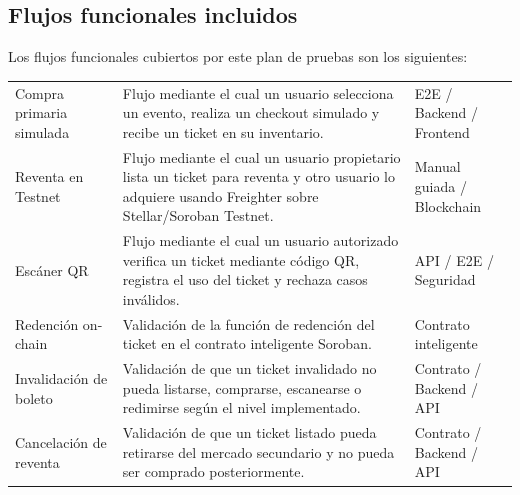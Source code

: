 \documentclass[12pt,letterpaper]{article}
\begin{document}
\subsection{Flujos funcionales incluidos}

Los flujos funcionales cubiertos por este plan de pruebas son los siguientes:

\begin{table}[H]
\centering

\begingroup
\scriptsize
\setlength{\tabcolsep}{3pt}
\renewcommand{\arraystretch}{1.22}

\begin{tabularx}{\textwidth}{|
>{\raggedright\arraybackslash}p{3.2cm}|
>{\raggedright\arraybackslash}X|
>{\raggedright\arraybackslash}p{3.4cm}|}
\hline
\multicolumn{1}{|>{\centering\arraybackslash}m{3.2cm}|}{\textbf{Flujo}} &
\multicolumn{1}{>{\centering\arraybackslash}m{7.2cm}|}{\textbf{Descripción}} &
\multicolumn{1}{>{\centering\arraybackslash}m{3.4cm}|}{\textbf{Tipo de prueba asociada}} \\
\hline

Compra primaria simulada &
Flujo mediante el cual un usuario selecciona un evento, realiza un checkout simulado y recibe un ticket en su inventario. &
E2E / Backend / Frontend \\
\hline

Reventa en Testnet &
Flujo mediante el cual un usuario propietario lista un ticket para reventa y otro usuario lo adquiere usando Freighter sobre Stellar/Soroban Testnet. &
Manual guiada / Blockchain \\
\hline

Escáner QR &
Flujo mediante el cual un usuario autorizado verifica un ticket mediante código QR, registra el uso del ticket y rechaza casos inválidos. &
API / E2E / Seguridad \\
\hline

Redención on-chain &
Validación de la función de redención del ticket en el contrato inteligente Soroban. &
Contrato inteligente \\
\hline

Invalidación de boleto &
Validación de que un ticket invalidado no pueda listarse, comprarse, escanearse o redimirse según el nivel implementado. &
Contrato / Backend / API \\
\hline

Cancelación de reventa &
Validación de que un ticket listado pueda retirarse del mercado secundario y no pueda ser comprado posteriormente. &
Contrato / Backend / API \\
\hline


\end{tabularx}
\end{table}
\end{document}
